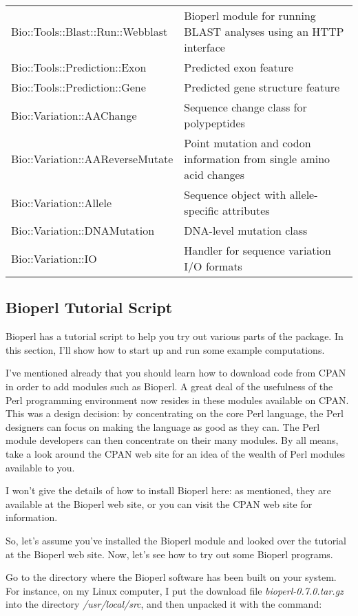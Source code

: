 \begin{table}[!htbp]
\begin{center}
\begin{tabu}{X[2,l]X[3,l]}
  Bio::Tools::Blast::Run::Webblast & Bioperl module for running BLAST analyses using an HTTP interface\\
  Bio::Tools::Prediction::Exon & Predicted exon feature\\
  Bio::Tools::Prediction::Gene & Predicted gene structure feature\\
  Bio::Variation::AAChange & Sequence change class for polypeptides\\
  Bio::Variation::AAReverseMutate & Point mutation and codon information from single amino acid changes\\
  Bio::Variation::Allele & Sequence object with allele-specific attributes\\
  Bio::Variation::DNAMutation & DNA-level mutation class\\
  Bio::Variation::IO & Handler for sequence variation I/O formats\\
  \bottomrule
  \end{tabu}
  \end{center}
\end{table}

\subsection{Bioperl Tutorial Script}
Bioperl has a tutorial script to help you try out various parts of the package. In this section, I'll show how to start up and run some example computations.

I've mentioned already that you should learn how to download code from CPAN in order to add modules such as Bioperl. A great deal of the usefulness of the Perl programming environment now resides in these modules available on CPAN. This was a design decision: by concentrating on the core Perl language, the Perl designers can focus on making the language as good as they can. The Perl module developers can then concentrate on their many modules. By all means, take a look around the CPAN web site for an idea of the wealth of Perl modules available to you.

I won't give the details of how to install Bioperl here: as mentioned, they are available at the Bioperl web site, or you can visit the CPAN web site for information.  

So, let's assume you've installed the Bioperl module and looked over the tutorial at the Bioperl web site. Now, let's see how to try out some Bioperl programs.

Go to the directory where the Bioperl software has been built on your system. For instance, on my Linux computer, I put the download file \textit{bioperl-0.7.0.tar.gz} into the directory \textit{/usr/local/src}, and then unpacked it with the command: 

